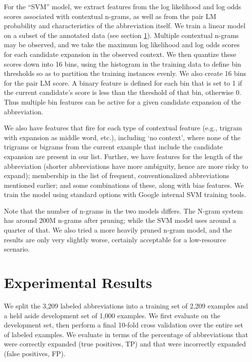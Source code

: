 \documentclass[11pt]{article}
\begin{document}
For the ``SVM'' model, we extract features from the log likelihood and
log odds scores associated with contextual n-grams, as well as from
the pair LM probability and characteristics of the
abbreviation itself. We train a linear model on a subset of the
annotated data (see section \ref{sec:baseline}).  Multiple contextual n-grams
may be observed, and we take the maximum log likelihood and log odds
scores for each candidate expansion in the observed context.  We then quantize 
these scores down into 16 bins, using the histogram in the training
data to define bin thresholds so as to partition the training
instances evenly.  We also create 16 bins for the pair LM
score.  A binary feature is defined for each bin that is set to 1 if the
current candidate's score is less than the threshold of that bin,
otherwise 0. Thus
multiple bin features can be active for a given candidate expansion of the abbreviation.

We also have features that fire for each type of contextual feature (e.g.,
trigram with expansion as middle word, etc.), including `no context', where none
of the trigrams or bigrams from the current example that include the candidate
expansion are present in our list.  Further, we have features for the length of the
abbreviation (shorter abbreviations have more ambiguity, hence are more
risky to expand); membership in the list of frequent, conventionalized abbreviations
mentioned earlier; and some combinations of these, along with bias features.  We
train the model using standard options with Google internal SVM training tools.

Note that the number of n-grams in the two models differs.  The N-gram
system has around 200M n-grams after pruning; while the SVM model uses
around a quarter of that.  We also tried a more heavily pruned n-gram
model, and the results are only very slightly worse, certainly acceptable
for a low-resource scenario.

\vspace{-0.2cm}
\section{Experimental Results}
\label{sec:baseline}
We split the 3,209 labeled abbreviations into a training set of 2,209 examples
and a held aside development set of 1,000 examples.  We first evaluate on the
development set, then perform a final 10-fold cross validation over the entire set of
labeled examples.  We evaluate in terms of the percentage of abbreviations that
were correctly expanded (true positives, TP) and that were incorrectly expanded
(false positives, FP).
\end{document}
